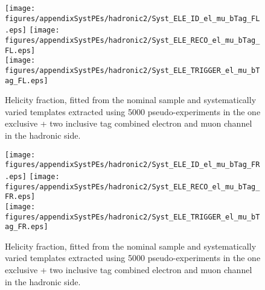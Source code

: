 \begin{figure}[!hb]
\begin{center}
        \texttt{[image: figures/appendixSystPEs/hadronic2/Syst\_ELE\_ID\_el\_mu\_bTag\_FL.eps]}
        \texttt{[image: figures/appendixSystPEs/hadronic2/Syst\_ELE\_RECO\_el\_mu\_bTag\_FL.eps]}\\
        \texttt{[image: figures/appendixSystPEs/hadronic2/Syst\_ELE\_TRIGGER\_el\_mu\_bTag\_FL.eps]}
\caption{Helicity fraction, \fl fitted from the nominal \ttbar sample and systematically varied templates extracted using 5000 pseudo-experiments in the one exclusive + two inclusive \bt tag combined electron and muon channel in the hadronic side. }
\label{fig:systematicVar_lep_FL_elmu2incl_ELE}
\end{center}
\end{figure}

\begin{figure}[!hb]
\begin{center}
        \texttt{[image: figures/appendixSystPEs/hadronic2/Syst\_ELE\_ID\_el\_mu\_bTag\_FR.eps]}
        \texttt{[image: figures/appendixSystPEs/hadronic2/Syst\_ELE\_RECO\_el\_mu\_bTag\_FR.eps]}\\
        \texttt{[image: figures/appendixSystPEs/hadronic2/Syst\_ELE\_TRIGGER\_el\_mu\_bTag\_FR.eps]}
\caption{Helicity fraction, \fr fitted from the nominal \ttbar sample and systematically varied templates extracted using 5000 pseudo-experiments in the one exclusive + two inclusive \bt tag combined electron and muon channel in the hadronic side. }
\label{fig:systematicVar_lep_FR_elmu2incl_ELE}
\end{center}
\end{figure}

\clearpage
